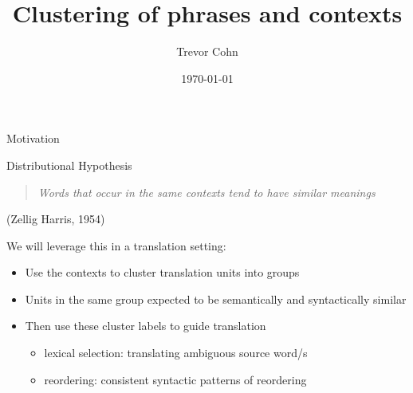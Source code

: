 \documentclass{beamer}
\title{Clustering of phrases and contexts}
\author{Trevor Cohn}
\date{\today}
\begin{document}
\begin{frame}[t]{Motivation}
\begin{exampleblock}{Distributional Hypothesis}
\begin{quote}
\emph{Words that occur in the same contexts tend to have similar meanings}
\end{quote}
\hfill (Zellig Harris, 1954)
\end{exampleblock}

\vspace{3ex}

We will leverage this in a translation setting:
\begin{itemize}
    \item Use the contexts to \alert{cluster} translation units into groups
    \item Units in the same group expected to be semantically and syntactically similar
    \item Then use these cluster labels to guide translation
    \begin{itemize}
        \item lexical selection: translating ambiguous source word/s
        \item reordering: consistent syntactic patterns of reordering
    \end{itemize}
\end{itemize}
\end{frame}
\end{document}
